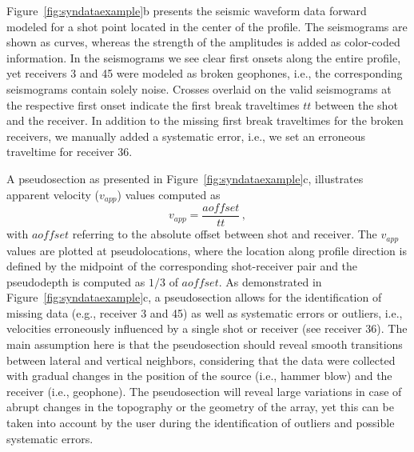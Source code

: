 \documentclass[a4paper,fleqn]{cas-sc}
\begin{document}

Figure~\ref{fig:syndataexample}b presents the seismic waveform data forward modeled for a shot point located in the center of the profile. The seismograms are shown as curves, whereas the strength of the amplitudes is added as color-coded information. In the seismograms we see clear first onsets along the entire profile, yet receivers 3 and 45 were modeled as broken geophones, i.e., the corresponding seismograms contain solely noise. Crosses overlaid on the valid seismograms at the respective first onset indicate the first break traveltimes $tt$ between the shot and the receiver. In addition to the missing first break traveltimes for the broken receivers, we manually added a systematic error, i.e., we set an erroneous traveltime for receiver 36.

A pseudosection as presented in Figure~\ref{fig:syndataexample}c, illustrates apparent velocity ($v_{app}$) values computed as
\begin{equation}
	v_{app}=\frac{aoffset}{tt}\,,
	\label{eq:vapp}
\end{equation}
with $aoffset$ referring to the absolute offset between shot and receiver. The $v_{app}$ values are plotted at pseudolocations, where the location along profile direction is defined by the midpoint of the corresponding shot-receiver pair and the pseudodepth is computed as $1/3$ of $aoffset$.
As demonstrated in Figure~\ref{fig:syndataexample}c, a pseudosection allows for the identification of missing data (e.g., receiver 3 and 45) as well as systematic errors or outliers, i.e., velocities erroneously influenced by a single shot or receiver (see receiver 36). The main assumption here is that the pseudosection should reveal smooth transitions between lateral and vertical neighbors, considering that the data were collected with gradual changes in the position of the source (i.e., hammer blow) and the receiver (i.e., geophone). The pseudosection will reveal large variations in case of abrupt changes in the topography or the geometry of the array, yet this can be taken into account by the user during the identification of outliers and possible systematic errors.
\end{document}
